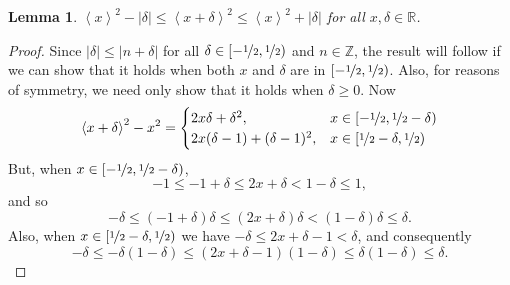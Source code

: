 \documentclass[aap]{imsart}
\newcommand{\reals}{{\mathbb R}}
\newcommand{\ints}{{\mathbb Z}}
\newcommand{\fracpart}[1]{\left\langle #1 \right\rangle}
\newcommand{\abs}[1]{\left\vert #1 \right\vert}
\newtheorem{lemma}{Lemma}
\begin{document}
\begin{lemma}\label{lem:boundedsquarefracparts}
$\fracpart{x}^2 - |\delta| \leq \fracpart{x + \delta}^2 \leq \fracpart{x}^2 + |\delta|$ for all $x, \delta \in \reals$.
\end{lemma}
\begin{proof}
Since $\abs{\delta} \leq \abs{n + \delta}$ for all $\delta \in [-\nicefrac{1}{2}, \nicefrac{1}{2})$ and $n \in \ints$, the result will follow if we can show that it holds when both $x$ and $\delta$ are in $[-\nicefrac{1}{2}, \nicefrac{1}{2})$.  Also, for reasons of symmetry, we need only show that it holds when $\delta \geq 0$.  Now
\[
\fracpart{x + \delta}^2 - x^2 = \begin{cases}
2x\delta + \delta^2, & x \in [-\nicefrac{1}{2}, \nicefrac{1}{2} - \delta) \\
2x(\delta-1) + (\delta-1)^2, & x \in [\nicefrac{1}{2} - \delta, \nicefrac{1}{2})
\end{cases}
\] 
But, when $x \in [-\nicefrac{1}{2}, \nicefrac{1}{2} - \delta)$, 
\[
-1 \leq -1 + \delta \leq 2x + \delta < 1 - \delta \leq 1,
\]
and so
\[
-\delta \leq (-1 + \delta)\delta \leq (2x + \delta)\delta < (1-\delta)\delta \leq \delta.
\]
Also, when $x \in [\nicefrac{1}{2} - \delta, \nicefrac{1}{2})$ we  have $-\delta \leq 2x + \delta - 1 < \delta$, and consequently
\[
-\delta \leq -\delta(1-\delta) \leq (2x + \delta - 1)(1 - \delta) \leq \delta(1 - \delta) \leq \delta.
\]


\end{proof}
\end{document}

